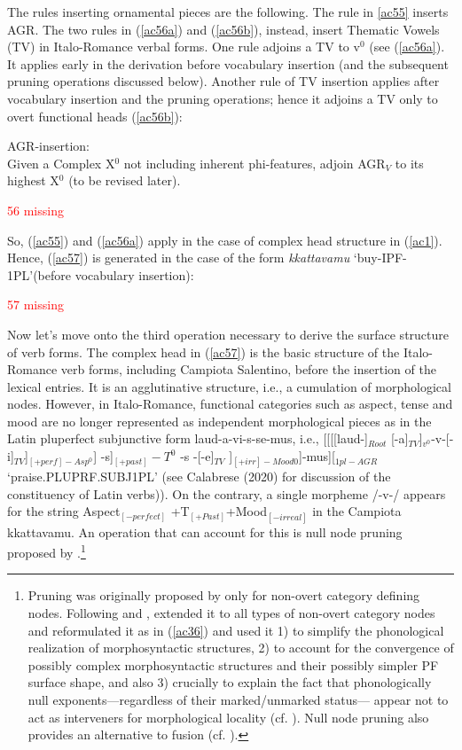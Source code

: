 \documentclass[output=paper]{langscibook}
\begin{document}
The rules inserting ornamental pieces are the following.  The rule in \ref{ac55} inserts AGR. The two rules in (\ref{ac56a}) and (\ref{ac56b}), instead, insert Thematic Vowels (TV) in Italo-Romance verbal forms. One rule adjoins a TV to v$^0$  (see (\ref{ac56a}). It applies early in the derivation before vocabulary insertion (and the subsequent pruning operations discussed below). Another rule of TV insertion applies after vocabulary insertion and the pruning operations; hence it adjoins a TV only to overt functional heads (\ref{ac56b}):

\ea \label{ac55}AGR-insertion:\\
 Given a Complex X$^0$ not including inherent phi-features, adjoin AGR$_V$ to its highest X$^0$ (to be revised later).
\z

\ea \label{ac56}
\textcolor{red}{56 missing}
    \ea \label{ac56a}
    \ex \label{ac56b}
    \z
\z

So, (\ref{ac55}) and (\ref{ac56a}) apply in the case of complex head structure in (\ref{ac1}).  Hence, (\ref{ac57}) is generated in the case of the form \textit{kkattavamu} ‘buy-IPF-1PL’(before vocabulary insertion):

\ea \label{ac57}\textcolor{red}{57 missing}
\z

Now let's move onto the third operation necessary to derive the surface structure of verb forms. The complex head in  (\ref{ac57}) is the basic structure of the Italo-Romance verb forms, including Campiota Salentino, before the insertion of the lexical entries. It is an agglutinative structure, i.e., a cumulation of morphological nodes. However, in Italo-Romance, functional categories such as aspect, tense and mood are no longer represented as independent morphological pieces as in the Latin pluperfect subjunctive form laud-a-vi-s-se-mus, i.e., [[[[laud-]$_{Root}$ [-a]$_{TV}$]$_{v^0}$-v-[-i]$_{TV}$]$_{[+perf]-Asp^0}$] -s]$_{[+past]}-T^0$  -s -[-e]$_{TV}$ ]$_{[+irr]-Mood0}$]-mus][$_{1pl-AGR}$  ‘praise.PLUPRF.SUBJ1PL’ (see Calabrese (2020) for discussion of the constituency of Latin verbs)). On the contrary, a single morpheme /-v-/ appears for the string Aspect$_{[-perfect]}$ +T$_{[+Past]}$+Mood$_{[-irreal]}$ in the Campiota kkattavamu.  An operation that can account for this is null node pruning proposed by \cite{calabrese2019a}.\footnote{Pruning was originally proposed by \cite{embick2010a} only for non-overt category defining nodes. Following \cite{christopoulos2017a} and \cite{christopoulos2018a}, \cite{calabrese2019a} extended it to all types of non-overt category nodes and reformulated it as in (\ref{ac36}) and used it 1) to simplify the phonological realization of morphosyntactic structures, 2) to account for the convergence of possibly complex morphosyntactic structures and their possibly simpler PF surface shape, and also 3) crucially to explain the fact that phonologically null exponents—regardless of their marked/unmarked status— appear not to act as interveners for morphological locality (cf. \cite{embick2010a, calabrese2019a}). Null node pruning also provides an alternative to fusion (cf. \cite{halle1993a}).}
 
\end{document}
